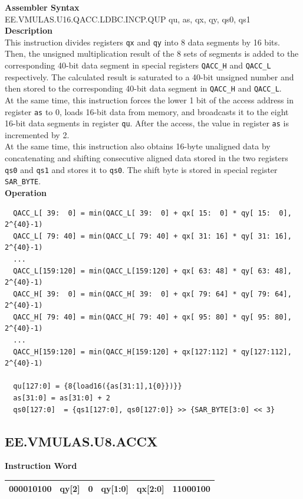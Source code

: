 \textbf{Assembler Syntax} \\
EE.VMULAS.U16.QACC.LDBC.INCP.QUP qu, as, qx, qy, qs0, qs1 \\
\textbf{Description} \\
This instruction divides registers \lstinline{qx} and \lstinline{qy} into 8 data segments by 16 bits. Then, the unsigned multiplication result of the 8 sets of segments is added to the corresponding 40-bit data segment in special registers \lstinline{QACC_H} and \lstinline{QACC_L} respectively. The calculated result is saturated to a 40-bit unsigned number and then stored to the corresponding 40-bit data segment in \lstinline{QACC_H} and \lstinline{QACC_L}.\\
At the same time, this instruction forces the lower 1 bit of the access address in register \lstinline{as} to 0, loads 16-bit data from memory, and broadcasts it to the eight 16-bit data segments in register \lstinline{qu}. After the access, the value in register \lstinline{as} is incremented by 2.\\
At the same time, this instruction also obtains 16-byte unaligned data by concatenating and shifting consecutive aligned data stored in the two registers \lstinline{qs0} and \lstinline{qs1} and stores it to \lstinline{qs0}. The shift byte is stored in special register \lstinline{SAR_BYTE}.\\
\textbf{Operation}
\begin{lstlisting}
  QACC_L[ 39:  0] = min(QACC_L[ 39:  0] + qx[ 15:  0] * qy[ 15:  0], 2^{40}-1)
  QACC_L[ 79: 40] = min(QACC_L[ 79: 40] + qx[ 31: 16] * qy[ 31: 16], 2^{40}-1)
  ...
  QACC_L[159:120] = min(QACC_L[159:120] + qx[ 63: 48] * qy[ 63: 48], 2^{40}-1)
  QACC_H[ 39:  0] = min(QACC_H[ 39:  0] + qx[ 79: 64] * qy[ 79: 64], 2^{40}-1)
  QACC_H[ 79: 40] = min(QACC_H[ 79: 40] + qx[ 95: 80] * qy[ 95: 80], 2^{40}-1)
  ...
  QACC_H[159:120] = min(QACC_H[159:120] + qx[127:112] * qy[127:112], 2^{40}-1)

  qu[127:0] = {8{load16({as[31:1],1{0}})}}
  as[31:0] = as[31:0] + 2
  qs0[127:0]  = {qs1[127:0], qs0[127:0]} >> {SAR_BYTE[3:0] << 3}
\end{lstlisting}

\clearpage
\subsection{EE.VMULAS.U8.ACCX}\label{instruction:EEVMULASU8ACCX}
\setlength\tabcolsep{6pt}
\textbf{Instruction Word} \\
\begin{tabular}{|c|c|c|c|c|c|}
	\hline
	000010100 & qy[2] & 0 & qy[1:0] & qx[2:0] & 11000100 \\
	\hline
\end{tabular}

